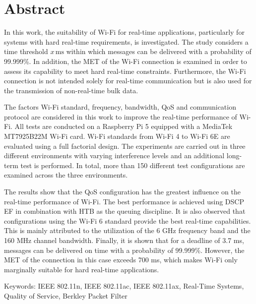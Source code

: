\chapter*{Abstract}
In this work, the suitability of Wi-Fi for real-time applications, particularly for systems with hard real-time requirements, is investigated.  
The study considers a time threshold \( x \, \text{ms} \) within which messages can be delivered with a probability of 99.999\%.  
In addition, the MET of the Wi-Fi connection is examined in order to assess its capability to meet hard real-time constraints.  
Furthermore, the Wi-Fi connection is not intended solely for real-time communication but is also used for the transmission of non-real-time bulk data.

The factors Wi-Fi standard, frequency, bandwidth, QoS and communication protocol are considered in this work to improve the real-time performance of Wi-Fi.  
All tests are conducted on a Raspberry Pi 5 equipped with a MediaTek MT7925B22M Wi-Fi card.  
Wi-Fi standards from Wi-Fi 4 to Wi-Fi 6E are evaluated using a full factorial design.  
The experiments are carried out in three different environments with varying interference levels and an additional long-term test is performed.  
In total, more than 150 different test configurations are examined across the three environments.

The results show that the QoS configuration has the greatest influence on the real-time performance of Wi-Fi.  
The best performance is achieved using DSCP EF in combination with HTB as the queuing discipline.  
It is also observed that configurations using the Wi-Fi 6 standard provide the best real-time capabilities.  
This is mainly attributed to the utilization of the 6 GHz frequency band and the 160 MHz channel bandwidth.  
Finally, it is shown that for a deadline of 3.7 ms, messages can be delivered on time with a probability of 99.999\%.  
However, the MET of the connection in this case exceeds 700 ms, which makes Wi-Fi only marginally suitable for hard real-time applications.

\bigskip

\noindent
Keywords: IEEE 802.11n, IEEE 802.11ac, IEEE 802.11ax, Real-Time Systems, Quality of Service, Berkley Packet Filter 

